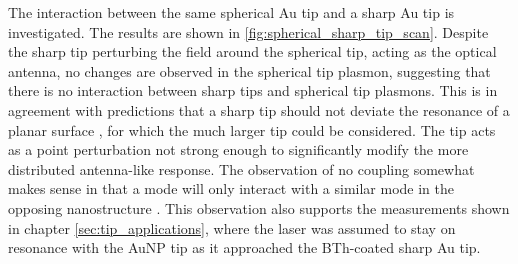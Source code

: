 \documentclass[a4paper]{article}
\begin{document}
The interaction between the same spherical Au tip and a sharp Au tip is investigated. The results are shown in \autoref{fig:spherical_sharp_tip_scan}. Despite the sharp tip perturbing the field around the spherical tip, acting as the optical antenna, no changes are observed in the spherical tip plasmon, suggesting that there is no interaction between sharp tips and spherical tip plasmons. This is in agreement with predictions that a sharp tip should not deviate the resonance of a planar surface \cite{downes2006, hugall2012}, for which the much larger tip could be considered. The tip acts as a point perturbation not strong enough to significantly modify the more distributed antenna-like response.
{\color{red}The observation of no coupling somewhat makes sense in that a mode will only interact with a similar mode in the opposing nanostructure \cite{nordlander2004}.}
This observation also supports the measurements shown in chapter \ref{sec:tip_applications}, where the laser was assumed to stay on resonance with the AuNP tip as it approached the BTh-coated sharp Au tip.
\end{document}
